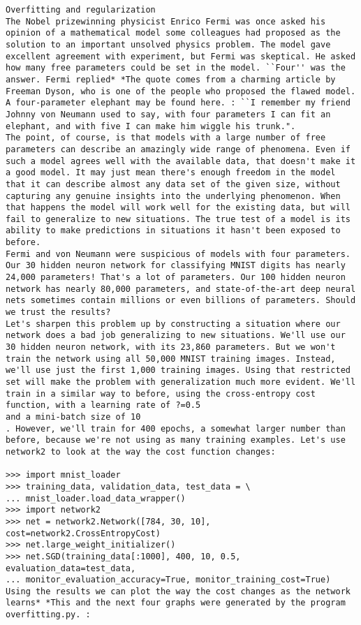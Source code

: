 \begin{lstlisting}
Overfitting and regularization
The Nobel prizewinning physicist Enrico Fermi was once asked his opinion of a mathematical model some colleagues had proposed as the solution to an important unsolved physics problem. The model gave excellent agreement with experiment, but Fermi was skeptical. He asked how many free parameters could be set in the model. ``Four'' was the answer. Fermi replied* *The quote comes from a charming article by Freeman Dyson, who is one of the people who proposed the flawed model. A four-parameter elephant may be found here. : ``I remember my friend Johnny von Neumann used to say, with four parameters I can fit an elephant, and with five I can make him wiggle his trunk.".
The point, of course, is that models with a large number of free parameters can describe an amazingly wide range of phenomena. Even if such a model agrees well with the available data, that doesn't make it a good model. It may just mean there's enough freedom in the model that it can describe almost any data set of the given size, without capturing any genuine insights into the underlying phenomenon. When that happens the model will work well for the existing data, but will fail to generalize to new situations. The true test of a model is its ability to make predictions in situations it hasn't been exposed to before.
Fermi and von Neumann were suspicious of models with four parameters. Our 30 hidden neuron network for classifying MNIST digits has nearly 24,000 parameters! That's a lot of parameters. Our 100 hidden neuron network has nearly 80,000 parameters, and state-of-the-art deep neural nets sometimes contain millions or even billions of parameters. Should we trust the results?
Let's sharpen this problem up by constructing a situation where our network does a bad job generalizing to new situations. We'll use our 30 hidden neuron network, with its 23,860 parameters. But we won't train the network using all 50,000 MNIST training images. Instead, we'll use just the first 1,000 training images. Using that restricted set will make the problem with generalization much more evident. We'll train in a similar way to before, using the cross-entropy cost function, with a learning rate of ?=0.5
and a mini-batch size of 10
. However, we'll train for 400 epochs, a somewhat larger number than before, because we're not using as many training examples. Let's use network2 to look at the way the cost function changes:
 
>>> import mnist_loader 
>>> training_data, validation_data, test_data = \
... mnist_loader.load_data_wrapper()
>>> import network2 
>>> net = network2.Network([784, 30, 10], cost=network2.CrossEntropyCost) 
>>> net.large_weight_initializer()
>>> net.SGD(training_data[:1000], 400, 10, 0.5, evaluation_data=test_data,
... monitor_evaluation_accuracy=True, monitor_training_cost=True)
Using the results we can plot the way the cost changes as the network learns* *This and the next four graphs were generated by the program overfitting.py. :


\end{lstlisting}
